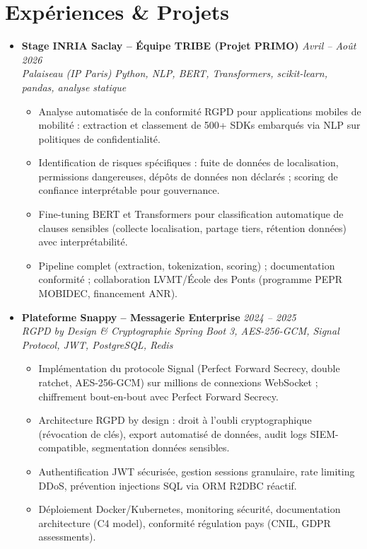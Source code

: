\documentclass[a4paper,11pt]{article}
\begin{document}
\section{Exp\'eriences \& Projets}
\begin{itemize}[leftmargin=*, label={-}]
    \item \textbf{Stage INRIA Saclay -- \'Equipe TRIBE (Projet PRIMO)} \hfill \textit{Avril -- Ao\^ut 2026} \\
    \textit{Palaiseau (IP Paris)} \hfill \textit{Python, NLP, BERT, Transformers, scikit-learn, pandas, analyse statique}
    \vspace{-2pt}
    \begin{itemize}[leftmargin=0.4cm, nosep, label=\tiny$\bullet$]
        \item \small{Analyse automatisée de la conformité RGPD pour applications mobiles de mobilité : extraction et classement de 500+ SDKs embarqués via NLP sur politiques de confidentialité.}
        \item \small{Identification de risques spécifiques : fuite de donn\'ees de localisation, permissions dangereuses, dépôts de données non déclarés ; scoring de confiance interprétable pour gouvernance.}
        \item \small{Fine-tuning BERT et Transformers pour classification automatique de clauses sensibles (collecte localisation, partage tiers, rétention données) avec interprétabilité.}
        \item \small{Pipeline complet (extraction, tokenization, scoring) ; documentation conformité ; collaboration LVMT/École des Ponts (programme PEPR MOBIDEC, financement ANR).}
    \end{itemize}
    \vspace{3pt}

    \item \textbf{Plateforme Snappy -- Messagerie Enterprise} \hfill \textit{2024 -- 2025} \\
    \textit{RGPD by Design \& Cryptographie} \hfill \textit{Spring Boot 3, AES-256-GCM, Signal Protocol, JWT, PostgreSQL, Redis}
    \vspace{-2pt}
    \begin{itemize}[leftmargin=0.4cm, nosep, label=\tiny$\bullet$]
        \item \small{Impl\'ementation du protocole Signal (Perfect Forward Secrecy, double ratchet, AES-256-GCM) sur millions de connexions WebSocket ; chiffrement bout-en-bout avec Perfect Forward Secrecy.}
        \item \small{Architecture RGPD by design : droit à l'oubli cryptographique (révocation de clés), export automatisé de données, audit logs SIEM-compatible, segmentation données sensibles.}
        \item \small{Authentification JWT sécurisée, gestion sessions granulaire, rate limiting DDoS, prévention injections SQL via ORM R2DBC réactif.}
        \item \small{Déploiement Docker/Kubernetes, monitoring sécurité, documentation architecture (C4 model), conformité régulation pays (CNIL, GDPR assessments).}
    \end{itemize}
    \vspace{3pt}


\end{itemize}
\end{document}
